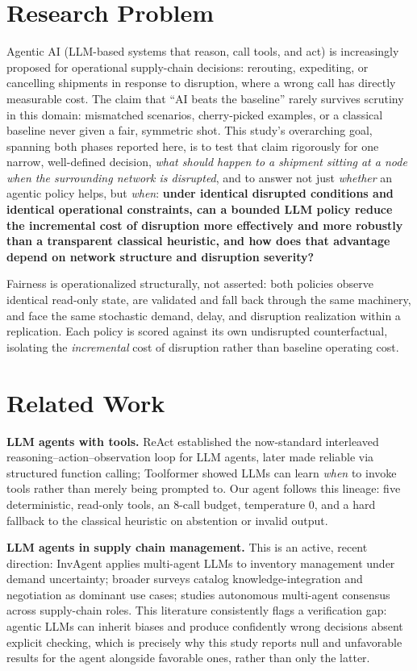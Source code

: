 \documentclass[10pt,twocolumn]{article}
\begin{document}
\section{Research Problem}
\label{sec:intro}
Agentic AI (LLM-based systems that reason, call tools, and act) is increasingly proposed for operational supply-chain decisions: rerouting, expediting, or cancelling shipments in response to disruption, where a wrong call has directly measurable cost. The claim that ``AI beats the baseline'' rarely survives scrutiny in this domain: mismatched scenarios, cherry-picked examples, or a classical baseline never given a fair, symmetric shot. This study's overarching goal, spanning both phases reported here, is to test that claim rigorously for one narrow, well-defined decision, \emph{what should happen to a shipment sitting at a node when the surrounding network is disrupted}, and to answer not just \emph{whether} an agentic policy helps, but \emph{when}: \textbf{under identical disrupted conditions and identical operational constraints, can a bounded LLM policy reduce the incremental cost of disruption more effectively and more robustly than a transparent classical heuristic, and how does that advantage depend on network structure and disruption severity?}

Fairness is operationalized structurally, not asserted: both policies observe identical read-only state, are validated and fall back through the same machinery, and face the same stochastic demand, delay, and disruption realization within a replication. Each policy is scored against its own undisrupted counterfactual, isolating the \emph{incremental} cost of disruption rather than baseline operating cost.

\section{Related Work}
\label{sec:relwork}
\textbf{LLM agents with tools.} ReAct \cite{yao2022react} established the now-standard interleaved reasoning--action--observation loop for LLM agents, later made reliable via structured function calling; Toolformer \cite{schick2023toolformer} showed LLMs can learn \emph{when} to invoke tools rather than merely being prompted to. Our agent follows this lineage: five deterministic, read-only tools, an 8-call budget, temperature 0, and a hard fallback to the classical heuristic on abstention or invalid output.

\textbf{LLM agents in supply chain management.} This is an active, recent direction: InvAgent \cite{invagent2024} applies multi-agent LLMs to inventory management under demand uncertainty; broader surveys \cite{llmscm2025} catalog knowledge-integration and negotiation as dominant use cases; \cite{agenticscm2025} studies autonomous multi-agent consensus across supply-chain roles. This literature consistently flags a verification gap: agentic LLMs can inherit biases and produce confidently wrong decisions absent explicit checking, which is precisely why this study reports null and unfavorable results for the agent alongside favorable ones, rather than only the latter.
\end{document}

